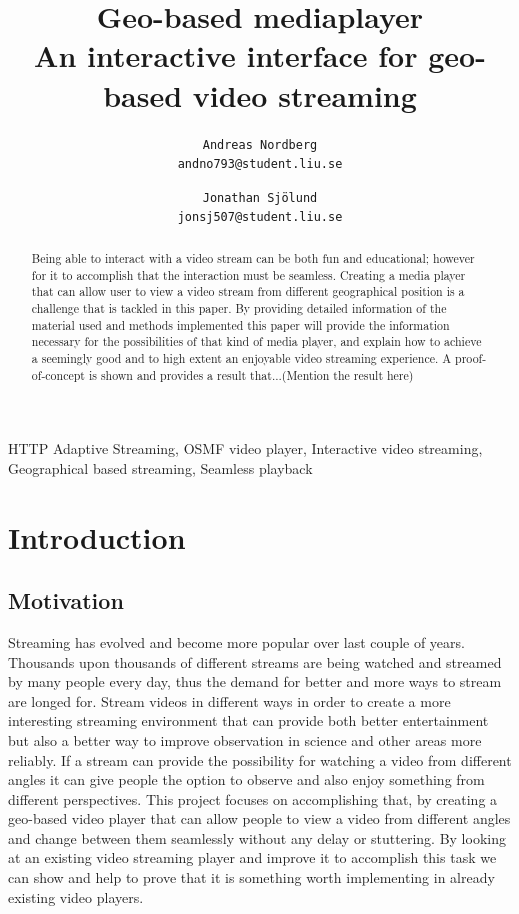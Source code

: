 \documentclass[9pt,a4paper]{acmproc}
\author{
\texttt{Andreas Nordberg}\\
\texttt{andno793@student.liu.se}
  \and
  \texttt{Jonathan Sjölund}\\
  \texttt{jonsj507@student.liu.se}
}
\begin{document}
\title{%
	Geo-based mediaplayer \\
	\large An interactive interface for geo-based video streaming}
\maketitle

\cleardoublepage
{}
\setcounter{page}{2}
\begin{abstract}
Being able to interact with a video stream can be both fun and educational; however for it to accomplish that the interaction must be seamless. Creating a media player that can allow user to view a video stream from different geographical position is a challenge that is tackled in this paper. By providing detailed information of the material used and methods implemented this paper will provide the information necessary for the possibilities of that kind of media player, and explain how to achieve a seemingly good and to high extent an enjoyable video streaming experience. A proof-of-concept is shown and provides a result that...(Mention the result here)

\end{abstract}

\begin{keywords}
HTTP Adaptive Streaming, OSMF video player, Interactive video streaming, Geographical based streaming, Seamless playback
\end{keywords}

\section{Introduction} 

\subsection{Motivation}
Streaming has evolved and become more popular over last couple of years. Thousands upon thousands of different streams are being watched and streamed by many people every day, thus the demand for better and more ways to stream are longed for. Stream videos in different ways in order to create a more interesting streaming environment that can provide both better entertainment but also a better way to improve observation in science and other areas more reliably. If a stream can provide the possibility for watching a video from different angles it can give people the option to observe and also enjoy something from different perspectives. This project focuses on accomplishing that, by creating a geo-based video player that can allow people to view a video from different angles and change between them seamlessly without any delay or stuttering. By looking at an existing video streaming player and improve it to accomplish this task we can show and help to prove that it is something worth implementing in already existing video players.
\end{document}
